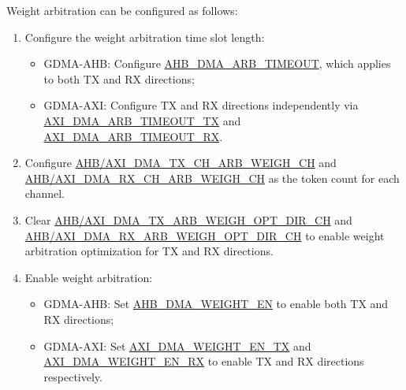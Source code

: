 \documentclass[main\_\_EN.tex]{subfiles}
\begin{document}
Weight arbitration can be configured as follows:
\begin{enumerate}
    \item Configure the weight arbitration time slot length:
        \begin{itemize}
            \item GDMA-AHB: Configure \hyperref[fielddesc:AHBDMAARBTIMEOUT]{AHB\_DMA\_ARB\_TIMEOUT}, which applies to both TX and RX directions;
            \item GDMA-AXI: Configure TX and RX directions independently via \hyperref[fielddesc:AXIDMAARBTIMEOUTTX]{AXI\_DMA\_ARB\_TIMEOUT\_TX} and \hyperref[fielddesc:AXIDMAARBTIMEOUTRX]{AXI\_DMA\_ARB\_TIMEOUT\_RX}.
        \end{itemize}
    \item Configure \hyperref[fielddesc:AHBDMATXCHARBWEIGHCHN]{AHB/AXI\_DMA\_TX\_CH\_ARB\_WEIGH\_CH} and \hyperref[fielddesc:AHBDMARXCHARBWEIGHCHN]{AHB/AXI\_DMA\_RX\_CH\_ARB\_WEIGH\_CH} as the token count for each channel.
    \item Clear \hyperref[fielddesc:AHBDMATXARBWEIGHOPTDIRCHN]{AHB/AXI\_DMA\_TX\_ARB\_WEIGH\_OPT\_DIR\_CH} and \hyperref[fielddesc:AHBDMARXARBWEIGHOPTDIRCHN]{AHB/AXI\_DMA\_RX\_ARB\_WEIGH\_OPT\_DIR\_CH} to enable weight arbitration optimization for TX and RX directions.
    \item Enable weight arbitration:
        \begin{itemize}
            \item GDMA-AHB: Set \hyperref[fielddesc:AHBDMAWEIGHTEN]{AHB\_DMA\_WEIGHT\_EN} to enable both TX and RX directions;
            \item GDMA-AXI: Set \hyperref[fielddesc:AXIDMAWEIGHTENTX]{AXI\_DMA\_WEIGHT\_EN\_TX} and \hyperref[fielddesc:AXIDMAWEIGHTENRX]{AXI\_DMA\_WEIGHT\_EN\_RX} to enable TX and RX directions respectively.
        \end{itemize}
\end{enumerate}




\end{document}

